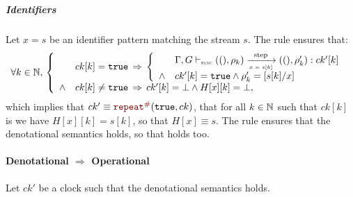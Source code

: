 \begin{skippableproof}
    \subparagraph{Identifiers}
    Let $x = s$ be an identifier pattern matching the stream $s$. The rule  ensures that:
    \begin{equation*}
        \begin{array}{l}
            \forall k \in \N, \,
            \left\{
            \begin{array}{ll}
                       & ck[k] = \true \, \Rightarrow \,
                \left\{
                \begin{array}{ll}
                           & \patOpsem{\rho_k}{x = s[k]}{ck'[k]}{\rho'_k} \\
                    \wedge & ck'[k] = \true \wedge \rho'_k = [s[k] / x]   \\
                \end{array}
                \right.                                     \\
                \wedge & ck[k] \neq \true \, \Rightarrow \,
                ck'[k] = \bot \wedge H[x][k] = \bot,        \\
            \end{array}
            \right.
        \end{array}
    \end{equation*}
    which implies that $ck' \equiv \const{\true}{ck}$, that for all $k \in
        \mathbb{N}$ such that $ck[k]$ is \true we have $H[x][k] = s[k]$, so that $H[x] \equiv
        s$. The rule  ensures that the denotational
    semantics  holds, so that
     holds too.

    \paragraph{Denotational $\Rightarrow$ Operational}
    Let $ck'$ be a clock such that the denotational semantics  holds.


\end{skippableproof}
